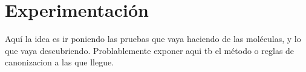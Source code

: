 \chapter{Experimentación}

Aquí la idea es ir poniendo las pruebas que vaya haciendo de las moléculas, y lo que vaya descubriendo. Problablemente exponer aqui tb el método o reglas de canonizacion a las que llegue.